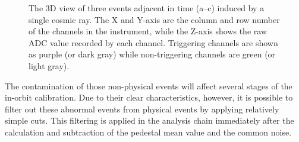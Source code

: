 \documentclass[preprint,sort&compress,12pt]{elsarticle}
\begin{document}
\begin{figure}[!ht]
\centering
{}
\caption{The 3D view of three events adjacent in time (a--c) induced by a single cosmic ray. The X and Y-axis are the column and row number of the channels in the instrument, while the Z-axis shows the raw ADC value recorded by each channel. Triggering channels are shown as purple (or dark gray) while non-triggering channels are green (or light gray).}\label{fig:post_cosmic}
\end{figure}

The contamination of those non-physical events will affect several stages of the in-orbit calibration. Due to their clear characteristics, however, it is possible to filter out these abnormal events from physical events by applying relatively simple cuts. This filtering is applied in the analysis chain immediately after the calculation and subtraction of the pedestal mean value and the common noise. 
\end{document}
